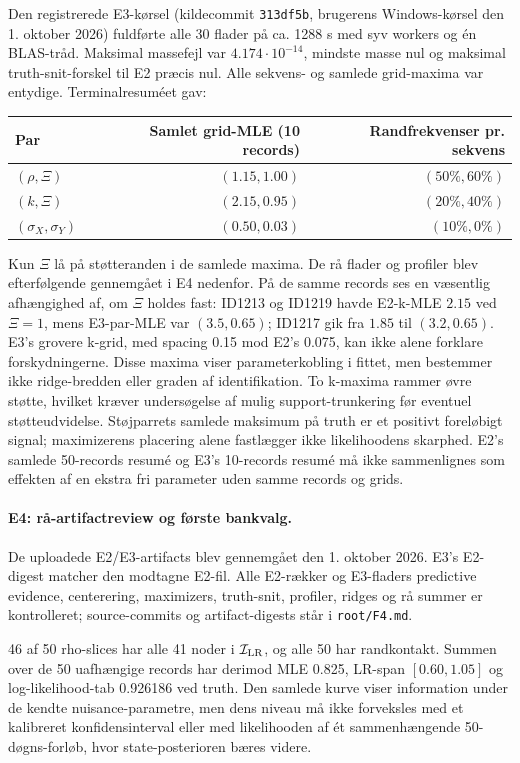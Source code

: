 Den registrerede E3-kørsel (kildecommit \texttt{313df5b}, brugerens Windows-kørsel
den 1. oktober 2026) fuldførte alle 30 flader på ca. 1288 s med syv workers
og én BLAS-tråd. Maksimal massefejl var \(4.174\cdot10^{-14}\), mindste masse
nul og maksimal truth-snit-forskel til E2 præcis nul. Alle sekvens- og samlede
grid-maxima var entydige. Terminalresuméet gav:
\begin{center}
\small
\begin{tabular}{lrr}
\toprule
Par & Samlet grid-MLE (10 records) & Randfrekvenser pr. sekvens \\
\midrule
\((\rho,\Xi)\) & \((1.15,1.00)\) & \((50\%,60\%)\) \\
\((k,\Xi)\) & \((2.15,0.95)\) & \((20\%,40\%)\) \\
\((\sigma_X,\sigma_Y)\) & \((0.50,0.03)\) & \((10\%,0\%)\) \\
\bottomrule
\end{tabular}
\end{center}
Kun \(\Xi\) lå på støtteranden i de samlede maxima. De rå flader og profiler
blev efterfølgende gennemgået i E4 nedenfor. På de samme records ses en væsentlig
afhængighed af, om \(\Xi\) holdes fast: ID1213 og ID1219 havde E2-k-MLE
\(2.15\) ved \(\Xi=1\), mens E3-par-MLE var \((3.5,0.65)\); ID1217 gik
fra \(1.85\) til \((3.2,0.65)\). E3's grovere k-grid, med spacing 0.15 mod
E2's 0.075, kan ikke alene forklare forskydningerne. Disse maxima viser
parameterkobling i fittet, men bestemmer ikke ridge-bredden eller graden af
identifikation. To k-maxima rammer øvre støtte, hvilket kræver undersøgelse
af mulig support-trunkering før eventuel støtteudvidelse.
Støjparrets samlede maksimum på truth er et positivt foreløbigt signal;
maximizerens placering alene fastlægger ikke likelihoodens skarphed.
E2's samlede 50-records resumé og E3's 10-records resumé må ikke sammenlignes
som effekten af en ekstra fri parameter uden samme records og grids.

\paragraph{E4: rå-artifactreview og første bankvalg.}
De uploadede E2/E3-artifacts blev gennemgået den 1. oktober 2026. E3's E2-digest
matcher den modtagne E2-fil. Alle E2-rækker og E3-fladers predictive evidence,
centerering, maximizers, truth-snit, profiler, ridges og rå summer er kontrolleret;
source-commits og artifact-digests står i \texttt{root/F4.md}.

46 af 50 rho-slices har alle 41 noder i \(\mathcal I_{\rm LR}\), og alle 50 har
randkontakt. Summen over de 50 uafhængige records har derimod MLE 0.825,
LR-span \([0.60,1.05]\) og log-likelihood-tab 0.926186 ved truth. Den samlede
kurve viser information under de kendte nuisance-parametre, men dens niveau
må ikke forveksles med et kalibreret konfidensinterval eller med likelihooden
af ét sammenhængende 50-døgns-forløb, hvor state-posterioren bæres videre.

